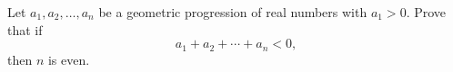 Let $a_1,a_2,\dots,a_n$ be a geometric progression of real numbers with $a_1>0$. Prove that if
\[
a_1+a_2+\cdots+a_n<0,
\]
then $n$ is even.
